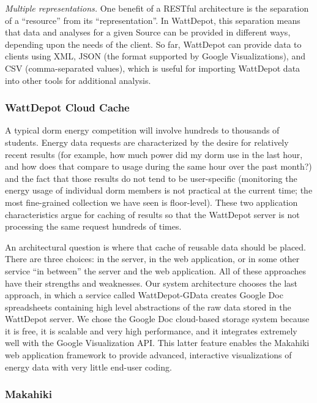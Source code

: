 {\em Multiple representations.} One benefit of a RESTful architecture is
the separation of a ``resource'' from its ``representation''.  In
WattDepot, this separation means that data and analyses for a given Source can
be provided in different ways, depending upon the needs of the client.  So
far, WattDepot can provide data to clients using XML, JSON (the format
supported by Google Visualizations), and CSV (comma-separated values),
which is useful for importing WattDepot data into other tools for
additional analysis.

\subsubsection{WattDepot Cloud Cache}

A typical dorm energy competition will involve hundreds to thousands of
students.  Energy data requests are characterized by the desire for
relatively recent results (for example, how much power did my dorm use in
the last hour, and how does that compare to usage during the same hour over
the past month?) and the fact that those results do not tend to be
user-specific (monitoring the energy usage of individual dorm members is
not practical at the current time; the most fine-grained collection we have
seen is floor-level). These two application characteristics argue for
caching of results so that the WattDepot server is not processing the same
request hundreds of times.

An architectural question is where that cache of reusable data should be
placed.  There are three choices: in the server, in the web application, or
in some other service ``in between'' the server and the web application.
All of these approaches have their strengths and weaknesses.  Our system
architecture chooses the last approach, in which a service called
WattDepot-GData creates Google Doc spreadsheets containing high level
abstractions of the raw data stored in the WattDepot server.  We chose the
Google Doc cloud-based storage system because it is free, it is scalable
and very high performance, and it integrates extremely well with the Google
Visualization API.  This latter feature enables the Makahiki web
application framework to provide advanced, interactive visualizations of
energy data with very little end-user coding.

\subsubsection{Makahiki}

